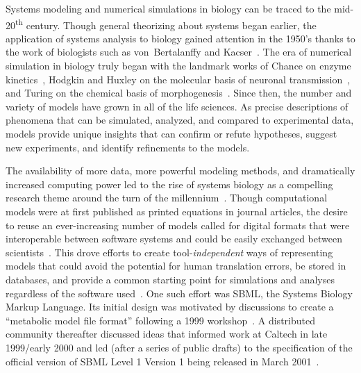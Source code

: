 \documentclass{sbml-paper}
\begin{document}
Systems modeling and numerical simulations in biology can be traced to the mid-20\textsuperscript{th} century. Though general theorizing about systems began earlier, the application of systems analysis to biology gained attention in the 1950's thanks to the work of biologists such as von~Bertalanffy and Kacser~\citep{Von_Bertalanffy1950-dy, Kacser1957-ox}. The era of numerical simulation in biology truly began with the landmark works of Chance on enzyme kinetics~\citep{chance1940kinetics}, Hodgkin and Huxley on the molecular basis of neuronal transmission~\citep{hodgkin1952quantitative}, and Turing on the chemical basis of morphogenesis~\citep{turing1990chemical}. Since then, the number and variety of models have grown in all of the life sciences. As precise descriptions of phenomena that can be simulated, analyzed, and compared to experimental data, models provide unique insights that can confirm or refute hypotheses, suggest new experiments, and identify refinements to the models.

The availability of more data, more powerful modeling methods, and dramatically increased computing power led to the rise of systems biology as a compelling research theme around the turn of the millennium~\citep{kitano2000perspectives, ideker2001new}. Though computational models were at first published as printed equations in journal articles, the desire to reuse an ever-increasing number of models called for digital formats that were interoperable between software systems and could be easily exchanged between scientists~\citep[topics of interest as early as the 1960's; c.f.][]{Garfinkel1969construction}. This drove efforts to create tool-\emph{independent} ways of representing models that could avoid the potential for human translation errors, be stored in databases, and provide a common starting point for simulations and analyses regardless of the software used~\citep{Lloyd2004-fd, Goddard2001-ix, hucka_2001}.  One such effort was SBML, the Systems Biology Markup Language. Its initial design was motivated by discussions to create a ``metabolic model file format'' following a 1999 workshop~\citep[recounted by][]{kell2008the}. A distributed community thereafter discussed ideas that informed work at Caltech in late 1999/early 2000 and led (after a series of public drafts) to the specification of the official version of SBML Level 1 Version 1 being released in March 2001~\citep{hucka_2003}.
\end{document}
